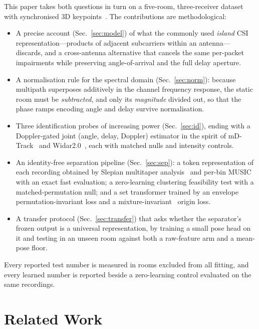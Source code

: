 \documentclass[conference]{IEEEtran}
\begin{document}
This paper takes both questions in turn on a five-room, three-receiver dataset
with synchronised 3D keypoints~\cite{perceptalign2026}. The contributions are
methodological:

\begin{itemize}
\item A precise account (Sec.~\ref{sec:model}) of what the commonly used
\emph{island} CSI representation---products of adjacent subcarriers within an
antenna---discards, and a cross-antenna alternative that cancels the same
per-packet impairments while preserving angle-of-arrival and the full delay
aperture.
\item A normalisation rule for the spectral domain (Sec.~\ref{sec:norm}):
because multipath superposes additively in the channel frequency response, the
static room must be \emph{subtracted}, and only its \emph{magnitude} divided
out, so that the phase ramps encoding angle and delay survive normalisation.
\item Three identification probes of increasing power (Sec.~\ref{sec:id}),
ending with a Doppler-gated joint (angle, delay, Doppler) estimator in the
spirit of mD-Track~\cite{xie2019mdtrack} and Widar2.0~\cite{qian2018widar2},
each with matched nulls and intensity controls.
\item An identity-free separation pipeline (Sec.~\ref{sec:sep}): a token
representation of each recording obtained by Slepian multitaper
analysis~\cite{thomson1982multitaper,slepian1978dpss} and per-bin
MUSIC~\cite{schmidt1986music} with an exact fast evaluation; a zero-learning
clustering feasibility test with a matched-permutation null; and a set
transformer trained by an envelope permutation-invariant loss and a
mixture-invariant~\cite{wisdom2020mixit} origin loss.
\item A transfer protocol (Sec.~\ref{sec:transfer}) that asks whether the
separator's frozen output is a universal representation, by training a small
pose head on it and testing in an unseen room against both a raw-feature arm
and a mean-pose floor.
\end{itemize}

Every reported test number is measured in rooms excluded from all fitting, and
every learned number is reported beside a zero-learning control evaluated on
the same recordings.

\section{Related Work}
\end{document}
